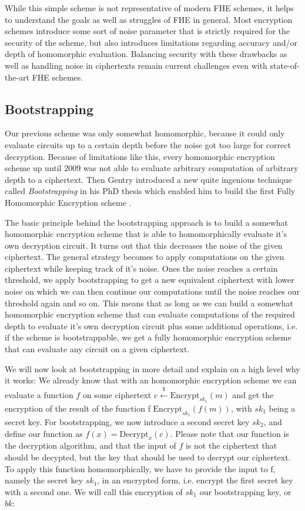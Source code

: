 While this simple scheme is not representative of modern FHE schemes, it helps to understand the goals as well as struggles of FHE in general. Most encryption schemes introduce some sort of noise parameter that is strictly required for the security of the scheme, but also introduces limitations regarding accuracy and/or depth of homomorphic evaluation. Balancing security with these drawbacks as well as handling noise in ciphertexts remain current challenges even with state-of-the-art FHE schemes.

\subsection{Bootstrapping}

Our previous scheme was only somewhat homomorphic, because it could only evaluate circuits up to a certain depth before the noise got too large for correct decryption. Because of limitations like this, every homomorphic encryption scheme up until 2009 was not able to evaluate arbitrary computation of arbitrary depth to a ciphertext. Then Gentry introduced a new quite ingenious technique called \emph{Bootstrapping} in his PhD thesis which enabled him to build the first Fully Homomorphic Encryption scheme \cite{gentry_fully_2009}.

The basic principle behind the bootstrapping approach is to build a somewhat homomorphic encryption scheme that is able to homomorphically evaluate it's own decryption circuit. It turns out that this decreases the noise of the given ciphertext. The general strategy becomes to apply computations on the given ciphertext while keeping track of it's noise. Ones the noise reaches a certain threshold, we apply bootstrapping to get a new equivalent ciphertext with lower noise on which we can then continue our computations until the noise reaches our threshold again and so on. This means that as long as we can build a somewhat homomorphic encryption scheme that can evaluate computations of the required depth to evaluate it's own decryption circuit plus some additional operations, i.e. if the scheme is bootstrappable, we get a fully homomorphic encryption scheme that can evaluate any circuit on a given ciphertext.

We will now look at bootstrapping in more detail and explain on a high level why it works: We already know that with an homomorphic encryption scheme we can evaluate a function $f$ on some ciphertext $c \xleftarrow{\$} \text{Encrypt}_{sk_1}(m)$ and get the encryption of the result of the function f $\text{Encrypt}_{sk_1}(f(m))$, with $sk_1$ being a secret key. For bootstrapping, we now introduce a second secret key $sk_2$, and define our function as $f(x) = \text{Decrypt}_x(c)$. Please note that our function is the decryption algorithm, and that the input of $f$ is not the ciphertext that should be decypted, but the key that should be used to decrypt our ciphertext. To apply this function homomorphically, we have to provide the input to f, namely the secret key $sk_1$, in an encrypted form, i.e. encrypt the first secret key with a second one. We will call this encryption of $sk_1$ our bootstrapping key, or $bk$:

